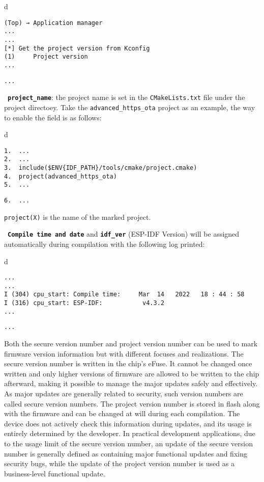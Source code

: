 \documentclass[a4paper,12pt]{book}
\begin{document}
\begin{codebloc}
\begin{tabular}{d}
\vspace{2pt}
\begin{verbatim}
(Top) → Application manager
...
...
[*] Get the project version from Kconfig
(1)     Project version
...
\end{verbatim}
\verb|...|
\end{tabular}
\end{codebloc}

\textbullet\ \textbf{\texttt{project\_name}}: the project name is set in the \verb|CMakeLists.txt| file under the project directoey. Take the \verb|advanced_https_ota| project as an example, the way to enable the field is as follows:

\begin{codebloc}
\begin{tabular}{d}
\vspace{2pt}
\begin{verbatim}
1.  ...
2.  ...
3.  include($ENV{IDF_PATH}/tools/cmake/project.cmake)
4.  project(advanced_https_ota)
5.  ...
\end{verbatim}
\verb|6.  ...|
\end{tabular}
\end{codebloc}

\verb|project(X)| is the name of the marked project.

\textbullet\ \textbf{\texttt{Compile time and date}} and \textbf{\texttt{idf\_ver}} (ESP-IDF Version) will be assigned automatically during compilation with the following log printed:

\begin{codebloc}
\begin{tabular}{d}
\vspace{2pt}
\begin{verbatim}
...
...
I (304) cpu_start: Compile time:     Mar  14   2022   18 : 44 : 58
I (316) cpu_start: ESP-IDF:           v4.3.2
...
\end{verbatim}
\verb|...|
\end{tabular}
\end{codebloc}

Both the secure version number and project version number can be used to mark firmware version information but with different focuses and realizations. The secure version number is written in the chip’s eFuse. It cannot be changed once written and only higher versions of firmware are allowed to be written to the chip afterward, making it possible to manage the major updates safely and effectively. As major updates are generally related to security, such version numbers are called secure version numbers. The project version number is stored in flash along with the firmware and can be changed at will during each compilation. The device does not actively check this information during updates, and its usage is entirely determined by the developer. In practical development applications, due to the usage limit of the secure version number, an update of the secure version number is generally defined as containing major functional updates and fixing security bugs, while the update of the project version number is used as a business-level functional update.
\end{document}
